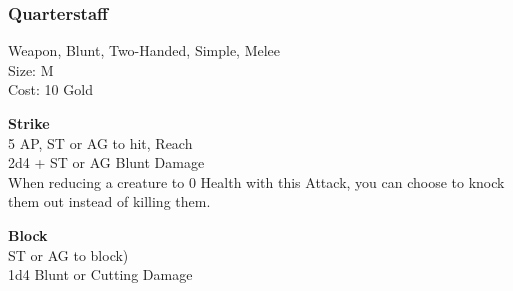 \subsubsection{Quarterstaff}\label{weapon:quarterstaff}
Weapon, Blunt, Two-Handed, Simple, Melee\\
Size: M\\
Cost: 10 Gold

\textbf{Strike}\\
5 AP, ST or AG to hit,  Reach\\
2d4 + \texttimes ST or AG Blunt Damage\\
When reducing a creature to 0 Health with this Attack, you can choose to knock them out instead of killing them.

\textbf{Block}\\
ST or AG to block)\\
1d4 Blunt or Cutting Damage

